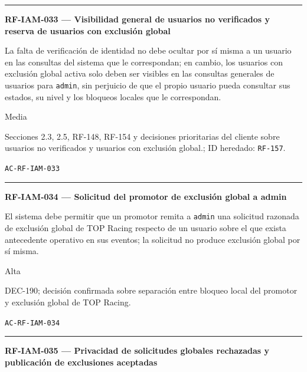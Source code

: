 \documentclass[10pt,letterpaper]{article}
\begin{document}
\vspace{0.25em}\hrule\vspace{0.65em}
\noindent\textbf{RF-IAM-033 --- Visibilidad general de usuarios no verificados y reserva de usuarios con exclusión global}\par
\begin{description}[style=nextline,leftmargin=3.15cm,labelwidth=2.8cm,font=\normalfont\bfseries]
\item[Obligación] La falta de verificación de identidad no debe ocultar por sí misma a un usuario en las consultas del sistema que le correspondan; en cambio, los usuarios con exclusión global activa solo deben ser visibles en las consultas generales de usuarios para \texttt{admin}, sin perjuicio de que el propio usuario pueda consultar sus estados, su nivel y los bloqueos locales que le correspondan.
\item[Prioridad] Media
\item[Procedencia] Secciones 2.3, 2.5, RF-148, RF-154 y decisiones prioritarias del cliente sobre usuarios no verificados y usuarios con exclusión global.; ID heredado: \texttt{RF-157}.
\item[Verificación] \texttt{AC-RF-IAM-033}
\end{description}
\vspace{0.25em}\hrule\vspace{0.65em}
\noindent\textbf{RF-IAM-034 --- Solicitud del promotor de exclusión global a admin}\par
\begin{description}[style=nextline,leftmargin=3.15cm,labelwidth=2.8cm,font=\normalfont\bfseries]
\item[Obligación] El sistema debe permitir que un promotor remita a \texttt{admin} una solicitud razonada de exclusión global de TOP Racing respecto de un usuario sobre el que exista antecedente operativo en sus eventos; la solicitud no produce exclusión global por sí misma.
\item[Prioridad] Alta
\item[Procedencia] DEC-190; decisión confirmada sobre separación entre bloqueo local del promotor y exclusión global de TOP Racing.
\item[Verificación] \texttt{AC-RF-IAM-034}
\end{description}
\vspace{0.25em}\hrule\vspace{0.65em}
\noindent\textbf{RF-IAM-035 --- Privacidad de solicitudes globales rechazadas y publicación de exclusiones aceptadas}\par
\end{document}
